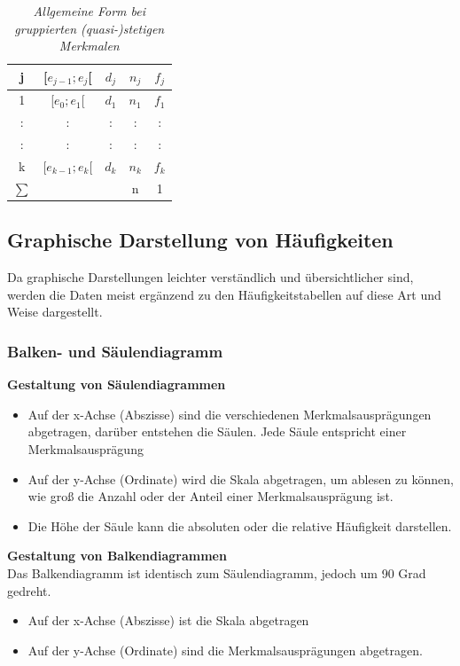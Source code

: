 \documentclass[a4paper]{article}
\begin{document}
\begin{table}[h!]
\centering
 \begin{tabular}{|c c c c c|} 
 \hline
j   & [$e_{j-1};e_j$[& $d_j$ & $n_j$ &$f_j$ \\ [0.5ex] 
 \hline\hline
 1 & [$e_0;e_1$[& $d_1$&$n_1$ & $f_1$ \\ 
 : & : & : & : & :\\
 : & : & : & : & : \\
 k & [$e_{k-1};e_k$[ & $d_k$ & $n_k$ & $f_k$ \\ [0,5ex] 
     \hline\hline
    $\sum$   &          &        & n     & 1 \\
 \hline
 \end{tabular}
  \caption{\textit{Allgemeine Form bei gruppierten (quasi-)stetigen Merkmalen}}
    \label{tab:stetige Merkmale}
\end{table}

\subsection{Graphische Darstellung von Häufigkeiten}
Da graphische Darstellungen leichter verständlich und übersichtlicher sind, werden die Daten meist ergänzend zu den Häufigkeitstabellen auf diese Art und Weise dargestellt.

\subsubsection{Balken- und Säulendiagramm}

\textbf{Gestaltung von Säulendiagrammen}
\begin{itemize}
    \item Auf der x-Achse (Abszisse) sind die verschiedenen Merkmalsausprägungen abgetragen, darüber entstehen die Säulen. Jede Säule entspricht einer Merkmalsausprägung
    \item Auf der y-Achse (Ordinate) wird die Skala abgetragen, um ablesen zu können, wie groß die Anzahl oder der Anteil einer Merkmalsausprägung ist.
    \item Die Höhe der Säule kann die absoluten oder die relative Häufigkeit darstellen. 
\end{itemize} 

\noindent\textbf{Gestaltung von Balkendiagrammen}\\
Das Balkendiagramm ist identisch zum Säulendiagramm, jedoch um 90 Grad gedreht.
\begin{itemize}
    \item Auf der x-Achse (Abszisse) ist die Skala abgetragen
    \item Auf der y-Achse (Ordinate) sind die Merkmalsausprägungen abgetragen.
\end{itemize} 
\end{document}

